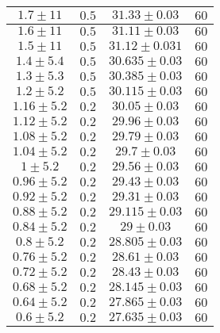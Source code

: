 \documentclass[@MAIN@]{subfile}
\begin{document}
\begin{tabular}{ ||c|c|c|c|| }
        \hline
        $1.7\pm 11$       & $0.5$       & $31.33\pm 0.03$  & $60$     \\
        \hline
        $1.6\pm 11$       & $0.5$       & $31.11\pm 0.03$  & $60$     \\
        \hline
        $1.5\pm 11$       & $0.5$       & $31.12\pm 0.031$ & $60$     \\
        \hline
        $1.4\pm 5.4$      & $0.5$       & $30.635\pm 0.03$ & $60$     \\
        \hline
        $1.3\pm 5.3$      & $0.5$       & $30.385\pm 0.03$ & $60$     \\
        \hline
        $1.2\pm 5.2$      & $0.5$       & $30.115\pm 0.03$ & $60$     \\
        \hline
        $1.16\pm 5.2$     & $0.2$       & $30.05\pm 0.03$  & $60$     \\
        \hline
        $1.12\pm 5.2$     & $0.2$       & $29.96\pm 0.03$  & $60$     \\
        \hline
        $1.08\pm 5.2$     & $0.2$       & $29.79\pm 0.03$  & $60$     \\
        \hline
        $1.04\pm 5.2$     & $0.2$       & $29.7\pm 0.03$   & $60$     \\
        \hline
        $1\pm 5.2$        & $0.2$       & $29.56\pm 0.03$  & $60$     \\
        \hline
        $0.96\pm 5.2$     & $0.2$       & $29.43\pm 0.03$  & $60$     \\
        \hline
        $0.92\pm 5.2$     & $0.2$       & $29.31\pm 0.03$  & $60$     \\
        \hline
        $0.88\pm 5.2$     & $0.2$       & $29.115\pm 0.03$ & $60$     \\
        \hline
        $0.84\pm 5.2$     & $0.2$       & $29\pm 0.03$     & $60$     \\
        \hline
        $0.8\pm 5.2$      & $0.2$       & $28.805\pm 0.03$ & $60$     \\
        \hline
        $0.76\pm 5.2$     & $0.2$       & $28.61\pm 0.03$  & $60$     \\
        \hline
        $0.72\pm 5.2$     & $0.2$       & $28.43\pm 0.03$  & $60$     \\
        \hline
        $0.68\pm 5.2$     & $0.2$       & $28.145\pm 0.03$ & $60$     \\
        \hline
        $0.64\pm 5.2$     & $0.2$       & $27.865\pm 0.03$ & $60$     \\
        \hline
        $0.6\pm 5.2$      & $0.2$       & $27.635\pm 0.03$ & $60$     \\

\end{tabular}
\end{document}
